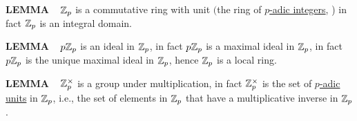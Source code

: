 \begin{x}{\small\bf LEMMA} \ %
$\mathbb{Z}_p$ is a commutative ring with unit $($the ring of 
\underline{$p$-adic integers}, 
)
in fact $\mathbb{Z}_p$ is an integral domain.\\
\end{x}

\vspace{0.1cm}

\begin{x}{\small\bf LEMMA} \ %
$p\mathbb{Z}_p$ is an ideal in $\mathbb{Z}_p$, in fact $p\mathbb{Z}_p$ is a maximal ideal in $\mathbb{Z}_p$, in fact $p\mathbb{Z}_p$ is the unique maximal ideal in $\mathbb{Z}_p$, hence $\mathbb{Z}_p$ is a local ring.\\
\end{x}

\vspace{0.1cm}

\begin{x}{\small\bf LEMMA} \ %
$\mathbb{Z}_p^\times$ is a group under multiplication, in fact $\mathbb{Z}_p^\times$ is the set of 
\underline{$p$-adic units}
in  $\mathbb{Z}_p$, i.e., the set of elements in $\mathbb{Z}_p$ that have a multiplicative inverse in $\mathbb{Z}_p$.\\
\end{x}

\vspace{0.1cm}

